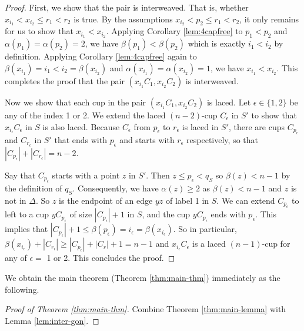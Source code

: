 \documentclass{amsart}
\theoremstyle{definition}
\numberwithin{thm}{section}
\begin{document}
\begin{proof}
First, we show that the pair is interweaved.
That is, whether $x_{i_1} < x_{i_2} \leq r_1 < r_2$ is true.
By the assumptions $x_{i_2} < p_2 \leq r_1 < r_2$,
it only remains for us to show that $x_{i_1} < x_{i_2}$.
Applying Corollary \ref{lem:4capfree} to $p_1 < p_2$ and $\alpha(p_1) = \alpha(p_2) = 2$, we have $\beta(p_1) < \beta(p_2)$ which is exactly $i_1 < i_2$ by definition.
Applying Corollary \ref{lem:4capfree} again to $\beta(x_{i_1}) = i_1 < i_2 = \beta(x_{i_2})$ and $\alpha(x_{i_1}) = \alpha(x_{i_2}) = 1$,
we have $x_{i_1} < x_{i_2}$.
This completes the proof that the pair $(x_{i_1}C_1, x_{i_2}C_2)$  is interweaved.

Now we show that each cup in the pair $(x_{i_1}C_1, x_{i_2}C_2)$ is laced.
Let $\epsilon \in \{1, 2\}$ be any of the index 1 or 2.
We extend the laced $(n-2)$-cup $C_\epsilon$ in $S'$ to show that $x_{i_\epsilon}C_\epsilon$ in $S$ is also laced.
Because $C_\epsilon$ from $p_\epsilon$ to $r_\epsilon$ is laced in $S'$, there are cups $C_{p_\epsilon}$ and $C_{r_\epsilon}$ in $S'$
that ends with $p_\epsilon$ and starts with $r_\epsilon$ respectively,
so that $|C_{p_\epsilon}| + |C_{r_\epsilon}| = n - 2$.

Say that $C_{p_\epsilon}$ starts with a point $z$ in $S'$.
Then $z \leq p_\epsilon < q_S$ so $\beta(z) < n - 1$ by the definition of $q_S$.
Consequently, we have $\alpha(z) \geq 2$ as $\beta(z) < n - 1$ and $z$ is not in $\Delta$.
So $z$ is the endpoint of an edge $yz$ of label 1 in $S$.
We can extend $C_{p_\epsilon}$ to left to a cup $yC_{p_\epsilon}$ of size $|C_{p_\epsilon}| + 1$ in $S$, and the cup $yC_{p_\epsilon}$ ends with $p_\epsilon$.
This implies that $|C_{p_\epsilon}| + 1 \leq \beta(p_\epsilon) = i_\epsilon = \beta(x_{i_\epsilon})$.
So in particular, $\beta(x_{i_\epsilon}) + |C_{r_i}| \geq |C_{p_\epsilon}| + |C_r| + 1 = n - 1$
and $x_{i_\epsilon}C_\epsilon$ is a laced $(n-1)$-cup for any of $\epsilon = $ 1 or 2. This concludes the proof.

\end{proof}

We obtain the main theorem (Theorem \ref{thm:main-thm}) immediately as the following.
\begin{proof}[Proof of Theorem \ref{thm:main-thm}]
Combine Theorem \ref{thm:main-lemma} with Lemma \ref{lem:inter-gon}.
\end{proof}
\end{document}

